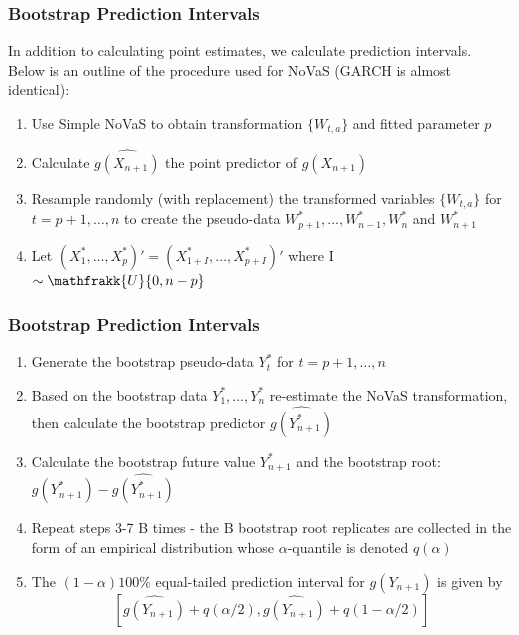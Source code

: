 \documentclass{beamer}
\newcounter{saveenumi}
\newcommand{\seti}{\setcounter{saveenumi}{\value{enumi}}}
\newcommand{\conti}{\setcounter{enumi}{\value{saveenumi}}}
\newcounter{saveenumi}
\newcommand{\seti}{\setcounter{saveenumi}{\value{enumi}}}
\newcommand{\conti}{\setcounter{enumi}{\value{saveenumi}}}
\begin{document}
\begin{frame}
\frametitle{Bootstrap Prediction Intervals}
In addition to calculating point estimates, we calculate prediction intervals.\\
\vspace{5pt}
Below is an outline of the procedure used for NoVaS (GARCH is almost identical):

\begin{enumerate}
\item{Use Simple NoVaS to obtain transformation $\{W_{t,a}\}$ and fitted parameter $p$}
\item{Calculate $\widehat{g(X_{n+1})}$ the point predictor of $g(X_{n+1})$}
\item{Resample randomly (with replacement) the transformed variables  $\{W_{t,a}\}$ for $t=p+1,\dots,n$ to create the pseudo-data $W_{p+1}^*,\dots, W_{n-1}^*, W_{n}^*$ and $W_{n+1}^*$}
\item{Let $(X_{1}^*,\dots,X_{p}^*)' = (X_{1+I}^*,\dots,X_{p+I}^*)'$ where I $\sim \mathfrakk{U}\{0,n-p\}$}
\seti
\end{enumerate}

\end{frame}

\begin{frame}
\frametitle{Bootstrap Prediction Intervals}
\begin{enumerate}
\conti
\item{Generate the bootstrap pseudo-data $Y_{t}^*$ for $t=p+1,\dots,n$}
\item{Based on the bootstrap data $Y_{1}^*,\dots,Y_{n}^*$ re-estimate the NoVaS transformation, then calculate the bootstrap predictor $\widehat{g(Y_{n+1}^*)}$}
\item{Calculate the bootstrap future value $Y_{n+1}^*$ and the bootstrap root: $g(Y_{n+1}^*) - \widehat{g(Y_{n+1}^*)}$}
\item{Repeat steps 3-7 B times - the B bootstrap root replicates are collected in the form of an empirical distribution whose $\alpha$-quantile is denoted $q(\alpha)$}
\item{The $(1-\alpha)100\%$ equal-tailed prediction interval for $g(Y_{n+1})$ is given by $$ [\widehat{g(Y_{n+1})} + q(\alpha/2), \widehat{g(Y_{n+1})} + q(1-\alpha/2)] $$}

\end{enumerate}
\end{frame}
\end{document}
